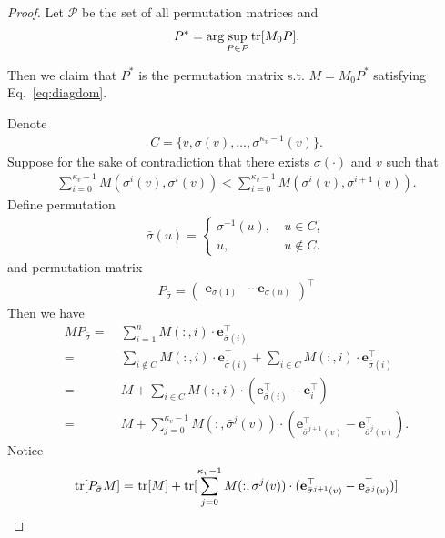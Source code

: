 \begin{proof}
Let $\mathcal{P}$ be the set of all permutation matrices and
\begin{align*}
    P^* = \arg \sup_{P \in \mathcal{P}} \mathrm{tr}[M_0 P].
\end{align*}

Then we claim that $P^*$ is the permutation matrix s.t. $M = M_0P^*$ satisfying Eq.~\eqref{eq:diagdom}. 

Denote 
\begin{align*}
    C = \{v, \sigma(v),\dots,\sigma^{\kappa_v-1}(v)\}.
\end{align*}
Suppose for the sake of contradiction that there exists $\sigma(\cdot)$ and $v$ such that 
\begin{align}\label{eq:cycle_not_satisfied}
    \sum_{i=0}^{\kappa_v-1} M(\sigma^i(v),\sigma^i(v)) < \sum_{i=0}^{\kappa_v-1} M(\sigma^i(v),\sigma^{i+1}(v)).
\end{align}
Define permutation
\begin{align*}
    \bar \sigma(u) = \begin{cases}
        \sigma^{-1}(u),&~ u \in C,\\
        u, &~ u \notin C.
    \end{cases}
\end{align*}
and permutation matrix
\begin{align*}
    P_{\bar \sigma} = \begin{pmatrix}
        \mathbf{e}_{\bar \sigma(1)} & \cdots \mathbf{e}_{\bar \sigma(n)}
    \end{pmatrix}^\top
\end{align*}
Then we have
\begin{align*}
    M P_{\bar \sigma}  = &~ \sum_{i=1}^n M(:,i) \cdot \mathbf{e}_{\bar \sigma(i)}^\top\\
    = &~  \sum_{i \notin C} M(:,i) \cdot \mathbf{e}_{\bar \sigma(i)}^\top + \sum_{i \in C} M(:,i) \cdot \mathbf{e}_{\bar \sigma(i)}^\top\\ 
    = &~ M + \sum_{i \in C} M(:,i) \cdot (\mathbf{e}_{\bar \sigma(i)}^\top - \mathbf{e}_i^\top)\\
    = &~ M + \sum_{j=0}^{\kappa_v-1} M(:,\bar \sigma^j(v)) \cdot (\mathbf{e}_{\bar \sigma^{j+1}(v)}^\top - \mathbf{e}_{\bar \sigma^j(v)}^\top ) .
\end{align*}
Notice
\begin{align*}
    \tr[P_{\bar \sigma} M] = &~ \tr[M] + \tr[\sum_{j=0}^{\kappa_v-1} M(:,\bar \sigma^j(v)) \cdot (\mathbf{e}_{\bar \sigma^{j+1}(v)}^\top - \mathbf{e}_{\bar \sigma^j(v)}^\top )]\\

\end{align*}
\end{proof}
